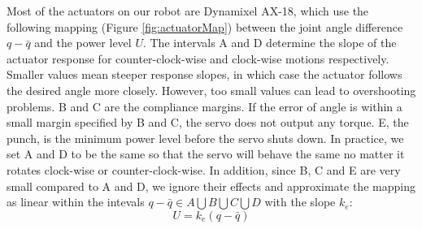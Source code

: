 Most of the actuators on our robot are Dynamixel AX-18, which use the following mapping (Figure \ref{fig:actuatorMap}) between the joint angle difference $q-\bar{q}$ and the power level $U$. The intervals A and D determine the slope of the actuator response for counter-clock-wise and clock-wise motions respectively. Smaller values mean steeper response slopes, in which case the actuator follows the desired angle more closely. However, too small values can lead to overshooting problems. B and C are the compliance margins. If the error of angle is within a small margin specified by B and C, the servo does not output any torque. E, the punch, is the minimum power level before the servo shuts down. In practice, we set A and D to be the same so that the servo will behave the same no matter it rotates clock-wise or counter-clock-wise. In addition, since B, C and E are very small compared to A and D, we ignore their effects and approximate the mapping as linear within the intevals $q-\bar{q}\in A\bigcup B\bigcup C\bigcup D$ with the slope $k_e$:
\begin{equation}
  U=k_e(q-\bar{q})
  \label{eqn:voltageErrorRelation}
\end{equation}

